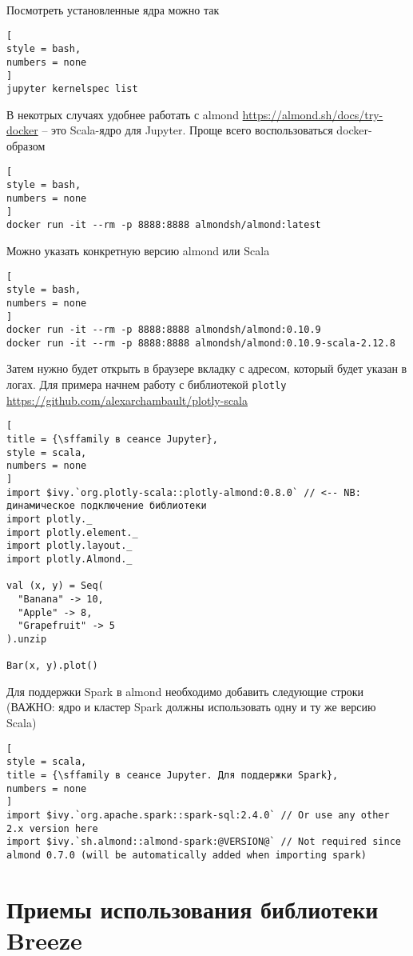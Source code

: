 \documentclass[%
	11pt,
	a4paper,
	utf8,
		]{article}
\begin{document}
Посмотреть установленные ядра можно так
\begin{lstlisting}[
style = bash,
numbers = none	
]
jupyter kernelspec list
\end{lstlisting}

В некотрых случаях удобнее работать с almond \url{https://almond.sh/docs/try-docker} -- это Scala-ядро для Jupyter. Проще всего воспользоваться docker-образом
\begin{lstlisting}[
style = bash,
numbers = none	
]
docker run -it --rm -p 8888:8888 almondsh/almond:latest
\end{lstlisting}

Можно указать конкретную версию almond или Scala
\begin{lstlisting}[
style = bash,
numbers = none	
]
docker run -it --rm -p 8888:8888 almondsh/almond:0.10.9
docker run -it --rm -p 8888:8888 almondsh/almond:0.10.9-scala-2.12.8
\end{lstlisting}

Затем нужно будет открыть в браузере вкладку с адресом, который будет указан в логах. Для примера начнем работу с библиотекой \texttt{plotly} \url{https://github.com/alexarchambault/plotly-scala}
\begin{lstlisting}[
title = {\sffamily в сеансе Jupyter},
style = scala,
numbers = none	
]
import $ivy.`org.plotly-scala::plotly-almond:0.8.0` // <-- NB: динамическое подключение библиотеки
import plotly._
import plotly.element._
import plotly.layout._
import plotly.Almond._

val (x, y) = Seq(
  "Banana" -> 10,
  "Apple" -> 8,
  "Grapefruit" -> 5
).unzip

Bar(x, y).plot()
\end{lstlisting}

Для поддержки Spark в almond необходимо добавить следующие строки (ВАЖНО: ядро и кластер Spark должны использовать одну и ту же версию Scala)
\begin{lstlisting}[
style = scala,
title = {\sffamily в сеансе Jupyter. Для поддержки Spark},
numbers = none	
]
import $ivy.`org.apache.spark::spark-sql:2.4.0` // Or use any other 2.x version here
import $ivy.`sh.almond::almond-spark:@VERSION@` // Not required since almond 0.7.0 (will be automatically added when importing spark)
\end{lstlisting}



\section{Приемы использования библиотеки Breeze}
\end{document}
